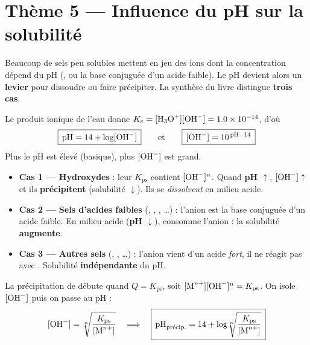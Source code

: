 \documentclass[11pt,a4paper]{article}
\begin{document}
\section*{\color{primarydark}Thème 5 — Influence du pH sur la solubilité}

Beaucoup de sels peu solubles mettent en jeu des ions dont la concentration dépend du pH (, ou
la base conjuguée d'un acide faible). Le pH devient alors un \textbf{levier} pour dissoudre ou faire
précipiter. La synthèse du livre distingue \textbf{trois cas}.

\begin{cle}
Le produit ionique de l'eau donne $K_e=[\ce{H3O+}][\ce{OH-}]=\num{1.0e-14}$, d'où
\[ \boxed{\,\mathrm{pH} = 14 + \log[\ce{OH-}]\,} \qquad\text{et}\qquad
   \boxed{\,[\ce{OH-}] = 10^{\,\mathrm{pH}-14}\,} \]
Plus le pH est élevé (basique), plus $[\ce{OH-}]$ est grand.
\end{cle}

\begin{cle}
\begin{itemize}[leftmargin=1.6em,topsep=2pt,itemsep=2.5pt]
  \item \textbf{Cas 1 --- Hydroxydes } : leur $K_{\mathrm{ps}}$ contient $[\ce{OH-}]^{n}$.
        Quand \textbf{pH $\uparrow$}, $[\ce{OH-}]\uparrow$ et ils \textbf{précipitent} (solubilité
        $\downarrow$). Ils se \emph{dissolvent} en milieu acide.
  \item \textbf{Cas 2 --- Sels d'acides faibles} (, , , \dots) :
        l'anion est la base conjuguée d'un acide faible. En milieu acide (\textbf{pH $\downarrow$}),
         consomme l'anion : la solubilité \textbf{augmente}.
  \item \textbf{Cas 3 --- Autres sels} (, , \dots) : l'anion vient d'un
        acide \emph{fort}, il ne réagit pas avec . Solubilité \textbf{indépendante} du pH.
  \end{itemize}
\end{cle}

\begin{methode}
La précipitation de  débute quand $Q=K_{\mathrm{ps}}$, soit
$[\ce{M^{n+}}][\ce{OH-}]^{n}=K_{\mathrm{ps}}$. On isole $[\ce{OH-}]$ puis on passe au pH :
\[ [\ce{OH-}] = \sqrt[n]{\dfrac{K_{\mathrm{ps}}}{[\ce{M^{n+}}]}}
   \quad\Longrightarrow\quad
   \boxed{\,\mathrm{pH}_{\text{précip.}} = 14 + \log\!\sqrt[n]{\dfrac{K_{\mathrm{ps}}}{[\ce{M^{n+}}]}}\,} \]
\end{methode}
\end{document}
